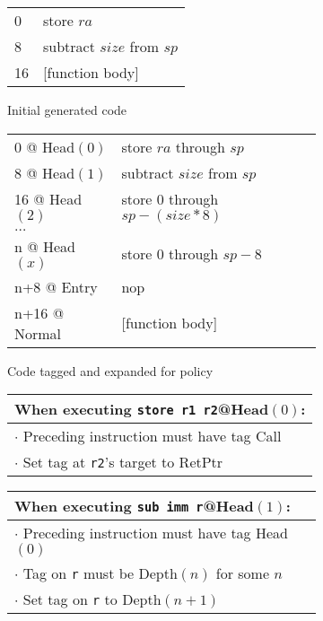 \documentclass{report}
\begin{document}
\begin{figure}
  \begin{subfigure}{0.4\textwidth}
    \begin{tabular}{l l}
      0 & store \(ra\) \\
      8 & subtract \(size\) from \(sp\) \\
      16 & [function body] \\
    \end{tabular}
    \caption{Initial generated code}
    \label{ex:call1}
  \end{subfigure}
  \begin{subfigure}{0.5\textwidth}
    \begin{tabular}{l l}
      0 @ {\sc Head}\((0)\) & store \(ra\) through \(sp\) \\
      8 @ {\sc Head}\((1)\) & subtract \(size\) from \(sp\) \\
      16 @ {\sc Head}\((2)\) & store \(0\) through \(sp-(size*8)\) \\
      \(\dots\) \\
      n @ {\sc Head}\((x)\) & store \(0\) through \(sp-8\) \\
      n+8 @ {\sc Entry} & nop \\
      n+16 @ {\sc Normal} & [function body] \\
    \end{tabular}
    \caption{Code tagged and expanded for policy}
    \label{ex:call2}
  \end{subfigure}

  \vspace{\belowdisplayskip}
  
  \begin{subfigure}{\textwidth}
    \begin{tabular}{|l|}
      \hline
      When executing {\tt store r1 r2}@{\sc Head}\((0)\): \\
      \hline
      \rowcolor{red!20}
      \(\cdot\) Preceding instruction must have tag {\sc Call} \\
      \rowcolor{red!20}
      \(\cdot\) Set tag at {\tt r2}'s target to {\sc RetPtr} \\
      \hline
    \end{tabular}
    \begin{tabular}{|l|}
      \hline
      When executing {\tt sub imm r}@{\sc Head}\((1)\): \\
      \hline
      \rowcolor{red!20}
      \(\cdot\) Preceding instruction must have tag {\sc Head}\((0)\) \\
      \rowcolor{blue!30}
      \(\cdot\) Tag on {\tt r} must be {\sc Depth}\((n)\) for some \(n\) \\
      \rowcolor{blue!30}
      \(\cdot\) Set tag on {\tt r} to {\sc Depth}\((n+1)\) \\
      \hline
    \end{tabular}


\end{subfigure}
\end{figure}
\end{document}
